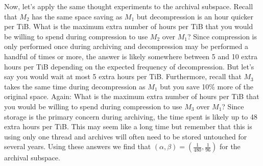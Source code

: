 Now, let's apply the same thought experiments to the archival subspace. Recall
that $M_2$ has the same space saving as $M_1$ but decompression is an hour
quicker per TiB. What is the maximum extra number of hours per TiB that you
would be willing to spend during compression to use $M_2$ over $M_1$? Since
compression is only performed once during archiving and decompression may be
performed a handful of times or more, the answer is likely somewhere between 5
and 10 extra hours per TiB depending on the expected frequency of decompression.
But let's say you would wait at most 5 extra hours per TiB. Furthermore, recall
that $M_3$ takes the same time during decompression as $M_1$ but you save
10\% more of the original space. Again: What is the maximum extra number
of hours per TiB that you would be willing to spend during compression to use
$M_3$ over $M_1$? Since storage is the primary concern during archiving, the
time spent is likely up to 48 extra hours per TiB. This may seem like a long
time but remember that this is using only one thread and archives will often
need to be stored untouched for several years. Using these answers we find that
$(\alpha,\beta)=(\frac{1}{480},\frac{1}{96})$ for the archival subspace.



